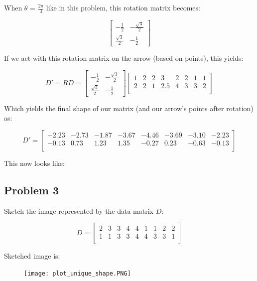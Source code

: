 \documentclass{article}
\begin{document}
When $\theta$ = $\frac{2\pi}{3}$ like in this problem, this rotation matrix becomes:

\[
\begin{bmatrix}
-\frac{1}{2} & -\frac{\sqrt{3}}{2} \\
\frac{\sqrt{3}}{2} & -\frac{1}{2}
\end{bmatrix}
\]

If we act with this rotation matrix on the arrow (based on points), this yields:

\[
  D' = RD =
  \begin{bmatrix}
   -\frac{1}{2} & -\frac{\sqrt{3}}{2} \\
   \frac{\sqrt{3}}{2} & -\frac{1}{2}
\end{bmatrix}
  \left[ {\begin{array}{cccccccc}
    1 & 2 & 2 & 3 & 2 & 2 & 1 & 1\\
    2 & 2 & 1 & 2.5 & 4 & 3 & 3 & 2\\
  \end{array} } \right]
\]

Which yields the final shape of our matrix (and our arrow's points after rotation) as:

\[
  D' =
  \left[ {\begin{array}{cccccccc}
    -2.23 & -2.73 & -1.87 & -3.67 & -4.46 & -3.69 & -3.10 & -2.23\\
    -0.13 & 0.73 & 1.23 & 1.35 & -0.27 & 0.23 & -0.63 & -0.13\\
  \end{array} } \right]
\]

This now looks like:



\subsection*{Problem 3}

Sketch the image represented by the data matrix $D$:

\[
  D =
  \left[ {\begin{array}{ccccccccc}
    2 & 3 & 3 & 4 & 4 & 1 & 1 & 2 & 2\\
    1 & 1 & 3 & 3 & 4 & 4 & 3 & 3 & 1\\
  \end{array} } \right]
\]

Sketched image is:

\begin{figure}[H]
  \centering
  \texttt{[image: plot\_unique\_shape.PNG]}
  \label{fig3}
\end{figure}
\end{document}
